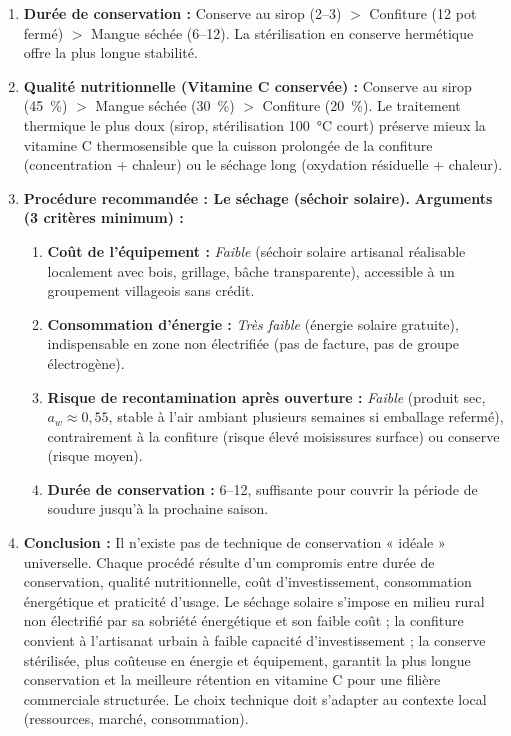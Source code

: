 \documentclass[11pt]{article}
\begin{document}
\begin{corrige}
\begin{enumerate}
\item \textbf{Durée de conservation :} Conserve au sirop (\SI{2}{\an}--\SI{3}{\an}) $>$ Confiture (\SI{12}{\month} pot fermé) $>$ Mangue séchée (\SI{6}{\month}--\SI{12}{\month}). La stérilisation en conserve hermétique offre la plus longue stabilité.
\item \textbf{Qualité nutritionnelle (Vitamine C conservée) :} Conserve au sirop (\SI{45}{\%}) $>$ Mangue séchée (\SI{30}{\%}) $>$ Confiture (\SI{20}{\%}). Le traitement thermique le plus doux (sirop, stérilisation \SI{100}{\degreeCelsius} court) préserve mieux la vitamine C thermosensible que la cuisson prolongée de la confiture (concentration + chaleur) ou le séchage long (oxydation résiduelle + chaleur).

\item \textbf{Procédure recommandée : Le séchage (séchoir solaire).}
\textbf{Arguments (3 critères minimum) :}
\begin{enumerate}
\item \textbf{Coût de l'équipement :} \emph{Faible} (séchoir solaire artisanal réalisable localement avec bois, grillage, bâche transparente), accessible à un groupement villageois sans crédit.
\item \textbf{Consommation d'énergie :} \emph{Très faible} (énergie solaire gratuite), indispensable en zone non électrifiée (pas de facture, pas de groupe électrogène).
\item \textbf{Risque de recontamination après ouverture :} \emph{Faible} (produit sec, $a_w \approx 0,55$, stable à l'air ambiant plusieurs semaines si emballage refermé), contrairement à la confiture (risque élevé moisissures surface) ou conserve (risque moyen).
\item \textbf{Durée de conservation :} \SI{6}{\month}--\SI{12}{\month}, suffisante pour couvrir la période de soudure jusqu'à la prochaine saison.
\end{enumerate}

\item \textbf{Conclusion :} Il n'existe pas de technique de conservation « idéale » universelle. Chaque procédé résulte d'un compromis entre durée de conservation, qualité nutritionnelle, coût d'investissement, consommation énergétique et praticité d'usage. Le séchage solaire s'impose en milieu rural non électrifié par sa sobriété énergétique et son faible coût ; la confiture convient à l'artisanat urbain à faible capacité d'investissement ; la conserve stérilisée, plus coûteuse en énergie et équipement, garantit la plus longue conservation et la meilleure rétention en vitamine C pour une filière commerciale structurée. Le choix technique doit s'adapter au contexte local (ressources, marché, consommation).
\end{enumerate}
\end{corrige}
\end{document}
